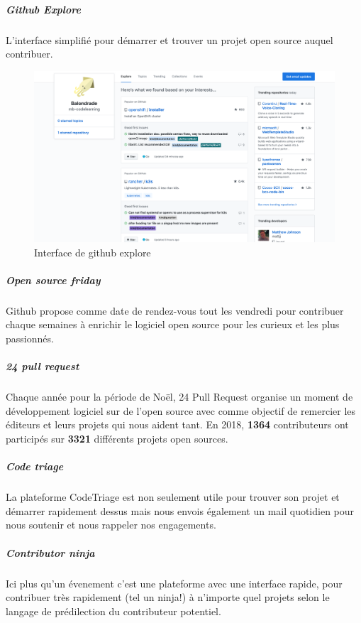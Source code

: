 				\newpage

				\subparagraph{Github Explore\\}
				L'interface simplifié pour démarrer et trouver un projet open source auquel contribuer.

				\begin{figure}[!htb]
					\center
					\includegraphics[scale=0.30]{./img/gh_explore_os}
					\caption{Interface de github explore}					
				\end{figure}

				\subparagraph{Open source friday\\}
				Github propose comme date de rendez-vous tout les vendredi pour contribuer chaque semaines à enrichir le logiciel open source pour les curieux et les plus passionnés.

				\subparagraph{24 pull request\\}

				Chaque année pour la période de Noël, 24 Pull Request organise un moment de développement logiciel sur de l'open source avec comme objectif de remercier les éditeurs et leurs projets qui nous aident tant.
				En 2018, \textbf{1364} contributeurs ont participés sur \textbf{3321} différents projets open sources.

				\subparagraph{Code triage\\}

				La plateforme CodeTriage est non seulement utile pour trouver son projet et démarrer rapidement dessus mais nous envois également un mail quotidien pour nous soutenir et nous rappeler nos engagements.

				\subparagraph{Contributor ninja\\}

				Ici plus qu'un évenement c'est une plateforme avec une interface rapide, pour contribuer très rapidement (tel un ninja!) à n'importe quel projets selon le langage de prédilection du contributeur potentiel.

